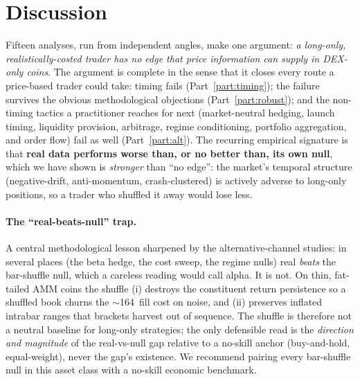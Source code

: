 \documentclass[12pt]{article}
\newcommand{\bp}{\,\text{bp}}
\begin{document}
\section{Discussion}\label{sec:disc}
Fifteen analyses, run from independent angles, make one argument: \emph{a long-only, realistically-costed trader has no edge that price information can supply in DEX-only coins}. The argument is complete in the sense that it closes every route a price-based trader could take: timing fails (Part~\ref{part:timing}); the failure survives the obvious methodological objections (Part~\ref{part:robust}); and the non-timing tactics a practitioner reaches for next (market-neutral hedging, launch timing, liquidity provision, arbitrage, regime conditioning, portfolio aggregation, and order flow) fail as well (Part~\ref{part:alt}). The recurring empirical signature is that \textbf{real data performs worse than, or no better than, its own null}, which we have shown is \emph{stronger} than ``no edge'': the market's temporal structure (negative-drift, anti-momentum, crash-clustered) is actively adverse to long-only positions, so a trader who shuffled it away would lose less.

\paragraph{The ``real-beats-null'' trap.} A central methodological lesson sharpened by the alternative-channel studies: in several places (the beta hedge, the cost sweep, the regime nulls) real \emph{beats} the bar-shuffle null, which a careless reading would call alpha. It is not. On thin, fat-tailed AMM coins the shuffle (i) destroys the constituent return persistence so a shuffled book churns the $\sim$164\bp{} fill cost on noise, and (ii) preserves inflated intrabar ranges that brackets harvest out of sequence. The shuffle is therefore not a neutral baseline for long-only strategies; the only defensible read is the \emph{direction and magnitude} of the real-vs-null gap relative to a no-skill anchor (buy-and-hold, equal-weight), never the gap's existence. We recommend pairing every bar-shuffle null in this asset class with a no-skill economic benchmark.
\end{document}
